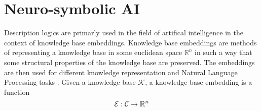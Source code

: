 

%
\chapter*{\thechapter \quad Neuro-symbolic AI}
\label{appendixB}

Description logics are primarly used in the field of artifical intelligence in the context of knowledge base embeddings.
Knowledge base embeddings are methods of representing a knowledge base in some euclidean space $\mathbb{R}^n$
in such a way that some structural properties of the knowledge base are preserved. The embeddings are then used
for different knowledge representation and Natural Language Processing tasks \cite{SurveryKG}.
Given a knowledge base $\mathcal{K}$, a knowledge base embedding is a function
\[
    \mathcal{E} : \mathcal{C} \rightarrow \mathbb{R}^n
\]



